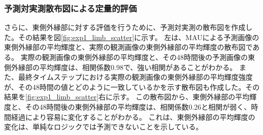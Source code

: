       \subsubsection{予測対実測散布図による定量的評価}
        さらに、東側外縁部に対する評価を行うために、予測対実測の散布図を作成した。その結果を図\ref{fig:exp1_limb_scatter}に示す。
        左は、MAUによる予測画像の東側外縁部の平均輝度と、実際の観測画像の東側外縁部の平均輝度の散布図である。
        実際の観測画像の東側外縁部の平均輝度と、その48時間後の予測画像の東側外縁部の平均輝度は、相関係数0.98で、強い相関があることがわかる。
        また、最終タイムステップにおける実際の観測画像の東側外縁部の平均輝度強度が、その48時間の値とどのように一致しているかを示す散布図も作成した。その結果を\ref{fig:exp1_limb_scatter}右に示す。
        この散布図から、東側外縁部の平均輝度と、その48時間後の東側外縁部の平均輝度は、相関係数0.26と相関が弱く、時間経過により容易に変化することがわかる。
        これは、東側外縁部の平均輝度の変化は、単純なロジックでは予測できないことを示している。
